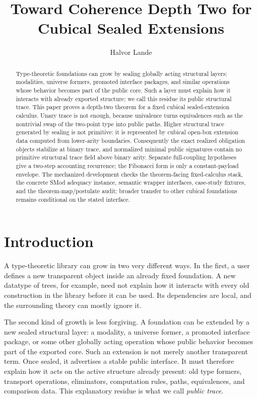 \documentclass{lmcs}
\title[Toward Coherence Depth Two]{Toward Coherence Depth Two for Cubical Sealed Extensions}
\author[H.\ Lande]{Halvor Lande}
\begin{document}
\begin{abstract}
Type-theoretic foundations can grow by sealing globally acting structural
layers: modalities, universe formers, promoted interface packages, and similar
operations whose behavior becomes part of the public core.  Such a layer must
explain how it interacts with already exported structure; we call this residue
its public structural trace.  This paper proves a depth-two theorem for a fixed
cubical sealed-extension calculus.  Unary trace is not enough, because
univalence turns equivalences such as the nontrivial swap of the two-point type
into public paths.  Higher structural trace generated by sealing is not
primitive: it is represented by cubical open-box extension data computed from
lower-arity boundaries.  Consequently the exact realized obligation objects
stabilize at binary trace, and normalized minimal public signatures contain no
primitive structural trace field above binary arity.  Separate full-coupling
hypotheses give a two-step accounting recurrence; the Fibonacci form is only a
constant-payload envelope.  The mechanized development checks the theorem-facing
fixed-calculus stack, the concrete SMod adequacy instance, semantic wrapper
interfaces, case-study fixtures, and the theorem-map/postulate audit; broader
transfer to other cubical foundations remains conditional on the stated
interface.
\end{abstract}
\maketitle

\section{Introduction}

A type-theoretic library can grow in two very different ways.  In the first,
a user defines a new transparent object inside an already fixed foundation.  A
new datatype of trees, for example, need not explain how it interacts with every
old construction in the library before it can be used.  Its dependencies are
local, and the surrounding theory can mostly ignore it.

The second kind of growth is less forgiving.  A foundation can be extended by a
new sealed structural layer: a modality, a universe former, a promoted interface
package, or some other globally acting operation whose public behavior becomes
part of the exported core.  Such an extension is not merely another transparent
term.  Once sealed, it advertises a stable public interface.  It must therefore
explain how it acts on the active structure already present: old type formers,
transport operations, eliminators, computation rules, paths, equivalences, and
comparison data.  This explanatory residue is what we call \emph{public trace}.
\end{document}
